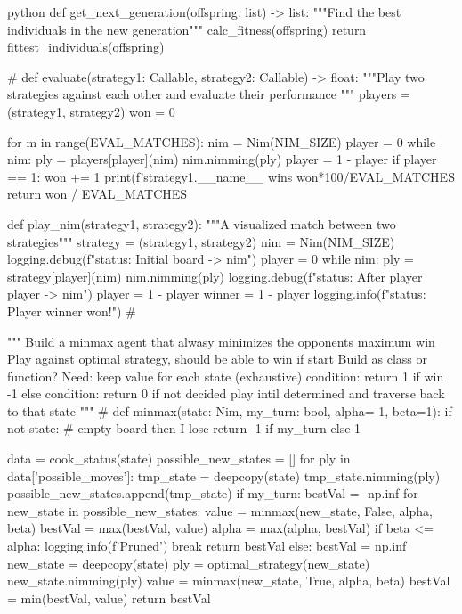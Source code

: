 \begin{mintedbox}{python}
    def get_next_generation(offspring: list) -> list:
        """Find the best individuals in the new generation"""
        calc_fitness(offspring)
        return fittest_individuals(offspring)


    # %
    def evaluate(strategy1: Callable, strategy2: Callable) -> float:
        """Play two strategies against each other and evaluate their performance """
        players = (strategy1, strategy2)
        won = 0

        for m in range(EVAL_MATCHES):
            nim = Nim(NIM_SIZE)
            player = 0
            while nim:
                ply = players[player](nim)
                nim.nimming(ply)
                player = 1 - player
            if player == 1:
                won += 1
        print(f'{strategy1.__name__} wins {won*100/EVAL_MATCHES} %
        return won / EVAL_MATCHES


    def play_nim(strategy1, strategy2):
        """A visualized match between two strategies"""
        strategy = (strategy1, strategy2)
        nim = Nim(NIM_SIZE)
        logging.debug(f"status: Initial board  -> {nim}")
        player = 0
        while nim:
            ply = strategy[player](nim)
            nim.nimming(ply)
            logging.debug(f"status: After player {player} -> {nim}")
            player = 1 - player
        winner = 1 - player
        logging.info(f"status: Player {winner} won!")
    # %

    """
        Build a minmax agent that alwasy minimizes the opponents maximum win
        Play against optimal strategy, should be able to win if start
        Build as class or function?
        Need:
            keep value for each state (exhaustive)
            condition: return 1 if win -1 else
            condition: return 0 if not decided
                play intil determined and traverse back to that state
    """
    # %
    def minmax(state: Nim, my_turn: bool, alpha=-1, beta=1):
        if not state:  # empty board then I lose
            return -1 if my_turn else 1

        data = cook_status(state)
        possible_new_states = []
        for ply in data['possible_moves']:
            tmp_state = deepcopy(state)
            tmp_state.nimming(ply)
            possible_new_states.append(tmp_state)
        if my_turn:
            bestVal = -np.inf
            for new_state in possible_new_states:
                value = minmax(new_state, False, alpha, beta)
                bestVal = max(bestVal, value)
                alpha = max(alpha, bestVal)
                if beta <= alpha:
                    logging.info(f'Pruned')
                    break
            return bestVal
        else:
            bestVal = np.inf
            new_state = deepcopy(state)
            ply = optimal_strategy(new_state)
            new_state.nimming(ply)
            value = minmax(new_state, True, alpha, beta)
            bestVal = min(bestVal, value)
            return bestVal


\end{mintedbox}
